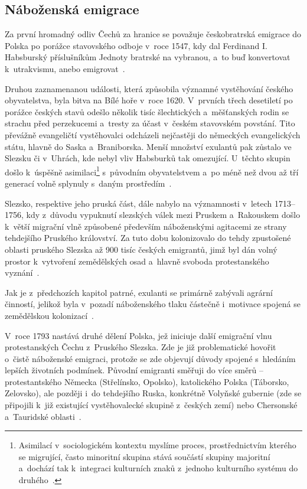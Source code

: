 \hypertarget{nuxe1boux17eenskuxe1-emigrace}{%
\subsection{Náboženská emigrace}\label{nuxe1boux17eenskuxe1-emigrace}}

Za první hromadný odliv Čechů za hranice se považuje českobratrská emigrace do Polska po porážce stavovského odboje v~roce 1547, kdy dal Ferdinand I. Habsburský příslušníkům Jednoty bratrské na vybranou, a~to buď konvertovat k~utrakvismu, anebo emigrovat~\parencite{Vaculik2009a}.

Druhou zaznamenanou události, která způsobila významné vystěhování českého obyvatelstva, byla bitva na Bílé hoře v~roce 1620. V~prvních třech desetiletí po porážce českých stavů odešlo několik tisíc šlechtických a~měšťanských rodin se strachu před perzekucemi a~tresty za účast v~českém stavovském povstání. Tito převážně evangeličtí vystěhovalci odcházeli nejčastěji do německých evangelických státu, hlavně do Saska a~Braniborska. Menší množství exulantů pak zůstalo ve Slezsku či v~Uhrách, kde nebyl vliv Habsburků tak omezující. U~těchto skupin došlo k~úspěšně asimilaci\footnote{Asimilací v~sociologickém kontextu myslíme proces, prostřednictvím kterého se migrující, často minoritní skupina stává součástí skupiny majoritní a~dochází tak k~integraci kulturních znaků z~jednoho kulturního systému do druhého~\parencite{Petrusek2017}.} s~původním obyvatelstvem a~po méně než dvou až tří generací volně splynuly s~daným prostředím~\parencite{Vaculik2002}.

Slezsko, respektive jeho pruská část, dále nabylo na významnosti v~letech 1713--1756, kdy z~důvodu vypuknutí slezských válek mezi Pruskem a~Rakouskem došlo k~větší migrační vlně způsobené především náboženskými agitacemi ze strany tehdejšího Pruského království. Za tuto dobu kolonizovalo do tehdy zpustošené oblasti pruského Slezska až 900 tisíc českých emigrantů, jimž byl dán volný prostor k~vytvoření zemědělských osad a~hlavně svoboda protestanského vyznání~\parencite{Vaculik2002}.

Jak je z~předchozích kapitol patrné, exulanti se primárně zabývali agrární činností, jelikož byla v~pozadí náboženského tlaku částečně i~motivace spojená se zemědělskou kolonizací~\parencite{Broucek2017}.

V~roce 1793 nastává druhé dělení Polska, jež iniciuje další emigrační vlnu protestanských Čechu z~Pruského Slezska. Zde je již problematické hovořit o~čistě náboženské emigraci, protože se zde objevují důvody spojené s~hledáním lepších životních podmínek. Původní emigranti směřuji do více směrů -- protestantského Německa (Střelínsko, Opolsko), katolického Polska (Táborsko, Zelovsko), ale později i~do tehdejšího Ruska, konkrétně Volyňské gubernie (zde se připojili k~již existující vystěhovalecké skupině z~českých zemí) nebo Chersonské a~Tauridské oblasti~\parencite{Vaculik2009a}.

